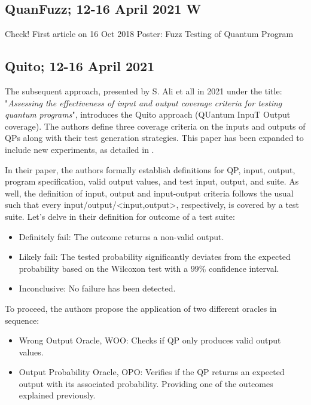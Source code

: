 \begin{itemize}
\vspace{15pt}
\subsection{QuanFuzz; 12-16 April 2021 W}

Check! First article on 16 Oct 2018 \cite{wang2018quanfuzz}
Poster: Fuzz Testing of Quantum Program 
 \cite{wang2021poster}

\vspace{15pt}
\subsection{Quito; 12-16 April 2021}
\label{Ch3.2.2:Quito}

 The subsequent approach, presented by S. Ali et all in 2021 under the title: "\textit{Assessing the effectiveness of input and output coverage criteria for testing quantum programs}"\cite{ali2021assessing}, introduces the Quito approach (QUantum InpuT Output coverage). The authors define three coverage criteria on the inputs and outputs of QPs along with their test generation strategies. This paper has been expanded to include new experiments, as detailed in \cite{wang2021quito}.\newline

In their paper, the authors formally establish definitions for QP, input, output, program specification, valid output values, and test input, output, and suite. As well, the definition of input, output and input-output criteria follows the usual such that every input/output/<input,output>, respectively,  is covered by a test suite. Let's delve in their definition for outcome of a test suite:

\vspace{8pt}
\begin{itemize}
    \item Definitely fail: The outcome returns a non-valid output.
    \item Likely fail: The tested probability significantly deviates from the expected probability based on the Wilcoxon test with a $99\%$ confidence interval.
    \item Inconclusive: No failure has been detected.
\end{itemize}

To proceed, the authors propose the application of two different oracles in sequence:

\vspace{-3pt}
\begin{itemize}
    \item Wrong Output Oracle, WOO: Checks if QP only produces valid output values.
    \item Output Probability Oracle, OPO: Verifies if the QP returns an expected output with its associated probability. Providing one of the outcomes explained previously.
\end{itemize}


\end{itemize}
